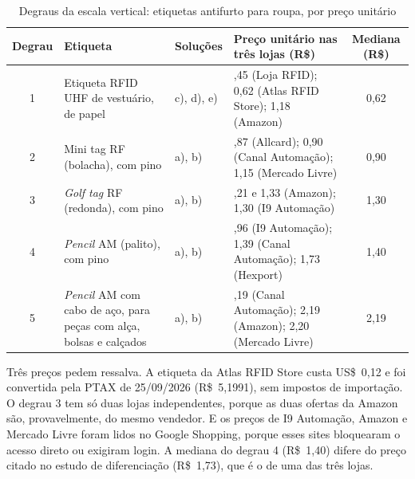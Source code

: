 \begin{table}[H]
    \centering
    \caption{Degraus da escala vertical: etiquetas antifurto para roupa, por preço unitário}
    \label{tab:escala_degraus}
    \footnotesize
    \renewcommand{\arraystretch}{1.25}
    \begin{tabularx}{\textwidth}{@{}
        c
        >{\RaggedRight\arraybackslash}p{3.6cm}
        >{\RaggedRight\arraybackslash}p{1.6cm}
        >{\RaggedRight\arraybackslash}X
        c@{}}
        \toprule
        \textbf{Degrau} & \textbf{Etiqueta} & \textbf{Soluções} & \textbf{Preço unitário nas três lojas (R\$)} & \textbf{Mediana (R\$)} \\
        \midrule
        1 & Etiqueta RFID UHF de vestuário, de papel & c), d), e) & 0,45 (Loja RFID); 0,62 (Atlas RFID Store); 1,18 (Amazon) & 0,62 \\
        2 & Mini tag RF (bolacha), com pino & a), b) & 0,87 (Allcard); 0,90 (Canal Automação); 1,15 (Mercado Livre) & 0,90 \\
        3 & \textit{Golf tag} RF (redonda), com pino & a), b) & 1,21 e 1,33 (Amazon); 1,30 (I9 Automação) & 1,30 \\
        4 & \textit{Pencil} AM (palito), com pino & a), b) & 0,96 (I9 Automação); 1,39 (Canal Automação); 1,73 (Hexport) & 1,40 \\
        5 & \textit{Pencil} AM com cabo de aço, para peças com alça, bolsas e calçados & a), b) & 2,19 (Canal Automação); 2,19 (Amazon); 2,20 (Mercado Livre) & 2,19 \\
        \bottomrule
    \end{tabularx}
\end{table}

Três preços pedem ressalva. A etiqueta da Atlas RFID Store custa US\$~0,12 e foi convertida pela PTAX de 25/09/2026 (R\$~5,1991), sem impostos de importação. O degrau 3 tem só duas lojas independentes, porque as duas ofertas da Amazon são, provavelmente, do mesmo vendedor. E os preços de I9 Automação, Amazon e Mercado Livre foram lidos no Google Shopping, porque esses sites bloquearam o acesso direto ou exigiram login. A mediana do degrau 4 (R\$~1,40) difere do preço citado no estudo de diferenciação (R\$~1,73), que é o de uma das três lojas.

